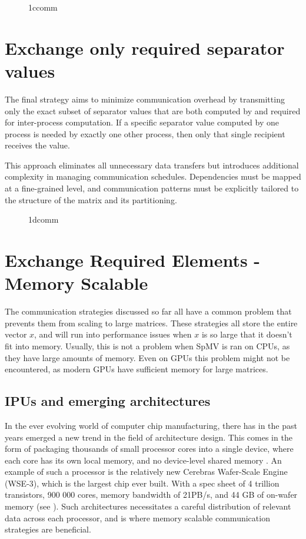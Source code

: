 \begin{figure}[ht]
    \centering
    \caption{1ccomm}
    \label{fig:1ccomm}
\end{figure}

\section{Exchange only required separator values}
The final strategy aims to minimize communication overhead by transmitting only the exact subset of separator values that are both computed by and required for inter-process computation. If a specific separator value computed by one process is needed by exactly one other process, then only that single recipient receives the value.

This approach eliminates all unnecessary data transfers but introduces additional complexity in managing communication schedules. Dependencies must be mapped at a fine-grained level, and communication patterns must be explicitly tailored to the structure of the matrix and its partitioning.



\begin{figure}[ht]
    \centering
    \caption{1dcomm}
    \label{fig:1dcomm}
\end{figure}


\section{Exchange Required Elements - Memory Scalable}
The communication strategies discussed so far all have a common problem that prevents them from scaling to large matrices. These strategies all store the entire vector \(x\), and will run into performance issues when \(x\) is so large that it doesn't fit into memory. Usually, this is not a problem when SpMV is ran on CPUs, as they have large amounts of memory. Even on GPUs this problem might not be encountered, as modern GPUs have sufficient memory for large matrices.
\medskip

\subsection{IPUs and emerging architectures}
In the ever evolving world of computer chip manufacturing, there has in the past years emerged a new trend in the field of architecture design. This comes in the form of packaging thousands of small processor cores into a single device, where each core has its own local memory, and no device-level shared memory \cite{10.3389/fphy.2023.979699}. An example of such a processor is the relatively new Cerebras Wafer-Scale Engine (WSE-3), which is the largest chip ever built. With a spec sheet of 4 trillion transistors, 900 000 cores, memory bandwidth of 21PB/s, and 44 GB of on-wafer memory (see \cite{cerebras2024wse3}). Such architectures necessitates a careful distribution of relevant data across each processor, and is where memory scalable communication strategies are beneficial.
\medskip




